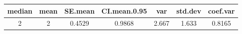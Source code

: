 \documentclass[]{article}
\begin{document}
\begin{longtable}[]{@{}ccccccc@{}}
\toprule
\begin{minipage}[b]{0.10\columnwidth}\centering\strut
median\strut
\end{minipage} & \begin{minipage}[b]{0.08\columnwidth}\centering\strut
mean\strut
\end{minipage} & \begin{minipage}[b]{0.11\columnwidth}\centering\strut
SE.mean\strut
\end{minipage} & \begin{minipage}[b]{0.17\columnwidth}\centering\strut
CI.mean.0.95\strut
\end{minipage} & \begin{minipage}[b]{0.09\columnwidth}\centering\strut
var\strut
\end{minipage} & \begin{minipage}[b]{0.11\columnwidth}\centering\strut
std.dev\strut
\end{minipage} & \begin{minipage}[b]{0.11\columnwidth}\centering\strut
coef.var\strut
\end{minipage}\tabularnewline
\midrule
\endhead
\begin{minipage}[t]{0.10\columnwidth}\centering\strut
2\strut
\end{minipage} & \begin{minipage}[t]{0.08\columnwidth}\centering\strut
2\strut
\end{minipage} & \begin{minipage}[t]{0.11\columnwidth}\centering\strut
0.4529\strut
\end{minipage} & \begin{minipage}[t]{0.17\columnwidth}\centering\strut
0.9868\strut
\end{minipage} & \begin{minipage}[t]{0.09\columnwidth}\centering\strut
2.667\strut
\end{minipage} & \begin{minipage}[t]{0.11\columnwidth}\centering\strut
1.633\strut
\end{minipage} & \begin{minipage}[t]{0.11\columnwidth}\centering\strut
0.8165\strut
\end{minipage}\tabularnewline
\bottomrule
\end{longtable}
\end{document}

